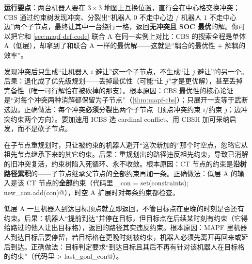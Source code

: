 \textbf{运行要点}：两台机器人要在 $3\times 3$ 地图上互换位置，直行会在中心格交换冲突；CBS 通过约束树发现冲突、分裂出“机器人 $0$ 不走中心边 / 机器人 $1$ 不走中心边”两个子节点，最终让其中一台绕行一格，返回\textbf{无冲突且 SOC 最优}的解。你可以把它和 \cref{sec:mapf-def-code} 联合 A\* 在同一实例上对比：CBS 的搜索全程是单体 A\*（低层），却拿到了和联合 A\* 一样的最优解——这就是“耦合的最优性 $+$ 解耦的效率”。

\begin{pitfall}
发现冲突后只生成“让机器人 $i$ 避让”这一个子节点，不生成“让 $j$ 避让”的另一个。后果：退化成了优先级规划——丢掉最优性（可能“让 $j$”才是更优解），甚至丢掉完备性（唯一可行解恰在被砍掉的那支）。根本原因：CBS 最优性的核心论证是“对每个冲突两种消解都保留为子节点”（\cref{thm:mapf-cbs}）；只展开一支等于武断选边。正确做法：每个冲突\textbf{必须}分裂出两个子节点（顶点冲突约束 $i$/约束 $j$；边冲突约束两个方向）。要加速用 ICBS 选 cardinal conflict、用 CBSH 加可采纳启发，而不是砍子节点。
\end{pitfall}

\begin{pitfall}
在子节点重规划时，只让被约束的机器人避开“这次新加的”那个时空点，忽略它从祖先节点继承下来的其它约束。后果：重规划出的路径违反祖先约束，导致已消解的旧冲突复活，约束树陷入死循环、永不收敛。根本原因：CT 节点的约束是\textbf{沿树路径累积}的——子节点继承父节点的全部约束再加一条。正确做法：低层 A\* 的输入是该 CT 节点的\textbf{全部}约束（代码里 \verb@new_con = set(constraints); new_con.add(con)@），时空 A\* 扩展时对每条约束都检查。
\end{pitfall}

\begin{pitfall}
低层 A\* 一旦机器人到达目标顶点就立即返回，不管目标点在更晚的时刻是否还有约束。后果：机器人“提前到达”并停在目标，但目标点在后续某时刻有约束（它得给路过的他人让出目标格），返回的路径其实违反约束。根本原因：MAPF 里机器人到达目标后要停留，若目标格在更晚时刻被约束，机器人必须先离开再回来或延后到达。正确做法：目标判定要求“到达目标且其后不再有针对该机器人在目标格的约束”（代码里 \verb@t > last_goal_con@）。
\end{pitfall}

